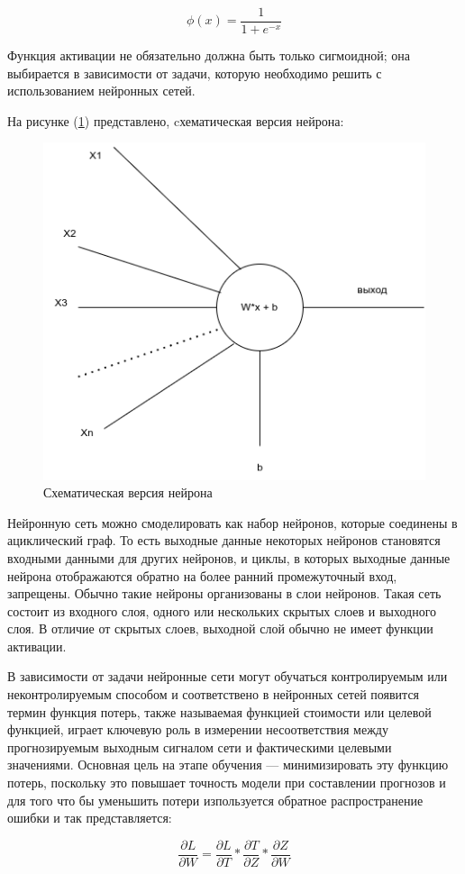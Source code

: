 \begin{equation}
    \phi(x) = \frac{1}{1 + e^{-x}}
\end{equation}

Функция активации не обязательно должна быть только сигмоидной; она выбирается в зависимости от задачи, которую необходимо решить с использованием нейронных сетей.

На рисунке (\ref{fig:neuron}) представлено, cхематическая версия нейрона: 
\begin{figure}[H]
	\centering
	\includegraphics[width=0.5\linewidth]{images/neuron.png}
	\caption{Схематическая версия нейрона}
	\label{fig:neuron}
\end{figure}

Нейронную сеть можно смоделировать как набор нейронов, которые соединены в ациклический граф. То есть выходные данные некоторых нейронов становятся входными данными для других нейронов, и циклы, в которых выходные данные нейрона отображаются обратно на более ранний промежуточный вход, запрещены. Обычно такие нейроны организованы в слои нейронов. Такая сеть состоит из входного слоя, одного или нескольких скрытых слоев и выходного слоя. В отличие от скрытых слоев, выходной слой обычно не имеет функции активации.

В зависимости от задачи нейронные сети могут обучаться контролируемым или неконтролируемым способом и соответствено в нейронных сетей появится термин функция потерь, также называемая функцией стоимости или целевой функцией, играет ключевую роль в измерении несоответствия между прогнозируемым выходным сигналом сети и фактическими целевыми значениями. Основная цель на этапе обучения — минимизировать эту функцию потерь, поскольку это повышает точность модели при составлении прогнозов и для того что бы уменьшить потери изпользуется обратное распространение ошибки и так представляется:

\begin{equation}
    \frac{\partial L}{\partial W} = \frac{\partial L}{\partial T} * \frac{\partial T}{\partial Z} * \frac{\partial Z}{\partial W}
\end{equation}

